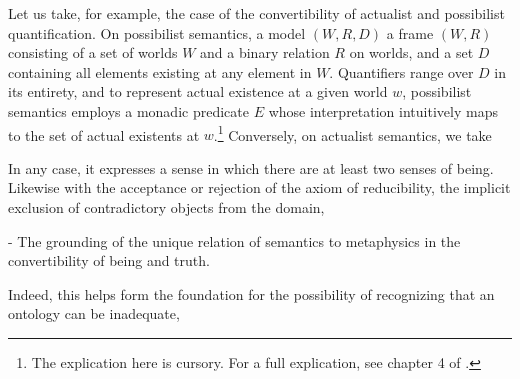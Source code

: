 \documentclass[]{article}
\begin{document}
Let us take, for example, the case of the convertibility of actualist and possibilist quantification. 
On possibilist semantics, a model $(W, R, D)$ a frame $(W, R)$ 
consisting of a set of worlds $W$ and a binary relation $R$ on worlds, 
and a set $D$ containing all elements existing at any element in $W$. 
Quantifiers range over $D$ in its entirety, and to represent actual existence at a given world $w$, possibilist semantics employs a monadic predicate $E$ 
whose interpretation intuitively maps to the set of actual existents at $w$.\footnote{
	The explication here is cursory. For a full explication, see chapter 4 of \autocite{Fitting1998}.}
Conversely, on actualist semantics, 
we take 

In any case, it expresses a sense in which there are at least two senses of being. 
Likewise with the acceptance or rejection of the axiom of reducibility, 
the implicit exclusion of contradictory objects from the domain, 

- The grounding of the unique relation of semantics to metaphysics in the convertibility of being and truth.


Indeed, this helps form the foundation for the possibility of recognizing that an ontology can be inadequate, 


\end{document}
